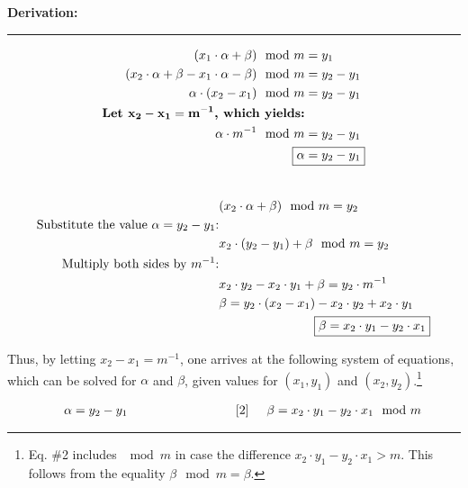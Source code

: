 \documentclass{article}
\begin{document}
\noindent \textbf{Derivation:}
\hrule

\begin{minipage}{.45\textwidth} %
 \begin{align*}
(x_1 \cdot \alpha + \beta) \mod m &= y_1 \\
(x_2 \cdot \alpha + \beta - x_1 \cdot \alpha - \beta) \mod m &= y_2 - y_1 \\
 \alpha \cdot (x_2 - x_1) \mod m &= y_2 - y_1 \\
\text{\textbf{Let $\mathbf{x_2-x_1 = m^{-1}}$, which yields:}}\\
  \alpha \cdot m^{-1} \mod m &= y_2 - y_1 \\
  \Aboxed{\alpha &= y_2 - y_1}  \\
  \\
\end{align*}
\end{minipage} %
\begin{minipage}{.5\textwidth}
\begin{align*}
&(x_2 \cdot \alpha + \beta) \mod m = y_2 \\
\text{Substitute the value $\alpha = y_2-y_1$:} & \\
&x_2 \cdot (y_2 - y_1) + \beta \mod m = y_2 \\
\text{Multiply both sides by $m^{-1}$:} & \\
& x_2 \cdot y_2 - x_2 \cdot y_1 + \beta = y_2 \cdot m^{-1} \\
& \beta = y_2 \cdot (x_2 - x_1) - x_2 \cdot y_2 + x_2 \cdot y_1  \\
& \Aboxed{\beta = x_2 \cdot y_1 - y_2 \cdot x_1 }
\end{align*}
\end{minipage}


Thus, by letting $x_2-x_1 = m^{-1}$, one arrives at the following system of equations, which can be solved for $\alpha$ and $\beta$, given values for $(x_1, y_1)$ and $(x_2, y_2)$.\footnote{Eq. \#2 includes $\mod m$ in case the difference $x_2 \cdot y_1 - y_2 \cdot x_1 > m$.  This follows from the equality $\beta \mod m = \beta$.}

\vspace{-.5 cm}
\begin{align*}
[1] \hspace{.5cm} \alpha = y_2 - y_1 \hspace{.25\textwidth} [2] \hspace{.5cm}\beta = x_2 \cdot y_1 - y_2 \cdot x_1 \mod m 
\end{align*}
\end{document}
